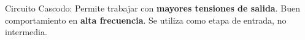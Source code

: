\documentclass[10pt,landscape]{article}
\makeatletter
\renewcommand{\subsubsection}{\@startsection{subsubsection}{3}{0mm}%
                                {-1ex plus -.5ex minus -.2ex}%
                                {1ex plus .2ex}%
                                {\normalfont\small\bfseries}}
\makeatother
\begin{document}
\begin{multicols}{3}
%


Circuito Cascodo: Permite trabajar con \textbf{mayores tensiones de salida}. Buen comportamiento en \textbf{alta frecuencia}. Se utiliza como etapa de entrada, no intermedia.


\end{multicols}
\end{document}
